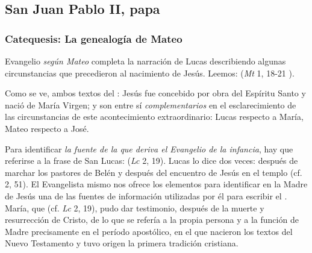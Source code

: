 \newsection			

\subsection{San Juan Pablo II, papa}

\subsubsection{Catequesis: La genealogía de Mateo}


\begin{body}
	 Evangelio \emph{según Mateo} completa la narración de Lucas describiendo algunas circunstancias que precedieron al nacimiento de Jesús. Leemos:  (\emph{Mt} 1, 18-21 ).
	
	Como se ve, ambos textos del : Jesús fue concebido por obra del Espíritu Santo y nació de María Virgen; y son entre sí \emph{complementarios} en el esclarecimiento de las circunstancias de este acontecimiento extraordinario: Lucas respecto a María, Mateo respecto a José.
	
	Para identificar \emph{la fuente de la que deriva el Evangelio de la infancia}, hay que referirse a la frase de San Lucas:  (\emph{Lc} 2, 19). Lucas lo dice dos veces: después de marchar los pastores de Belén y después del encuentro de Jesús en el templo (cf. 2, 51). El Evangelista mismo nos ofrece los elementos para identificar en la Madre de Jesús una de las fuentes de información utilizadas por él para escribir el . María, que  (cf. \emph{Lc} 2, 19), pudo dar testimonio, después de la muerte y resurrección de Cristo, de lo que se refería a la propia persona y a la función de Madre precisamente en el período apostólico, en el que nacieron los textos del Nuevo Testamento y tuvo origen la primera tradición cristiana.
	

\end{body}
